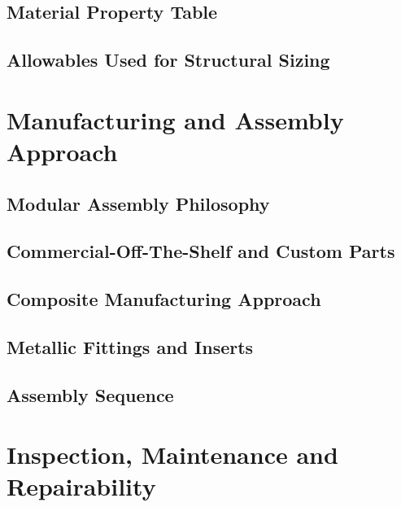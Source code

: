 \subsection{Material Property Table}
\subsection{Allowables Used for Structural Sizing}


\section{Manufacturing and Assembly Approach}
\subsection{Modular Assembly Philosophy}
\subsection{Commercial-Off-The-Shelf and Custom Parts}
\subsection{Composite Manufacturing Approach}
\subsection{Metallic Fittings and Inserts}
\subsection{Assembly Sequence}


\section{Inspection, Maintenance and Repairability}


